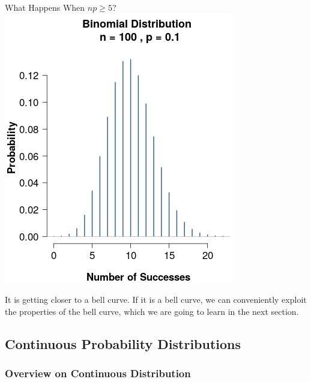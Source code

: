 \documentclass{beamer}
\begin{document}
\begin{frame}{What Happens When $np \geq 5$? }
\includegraphics[scale=0.34]{images/section4BinomNP3.png}

\vspace{0.3 cm}
It is getting closer to a bell curve. If it is a bell curve, we can conveniently exploit the properties of the bell curve, which we are going to learn in the next section. 

\end{frame}


\subsection{Continuous Probability Distributions}
\begin{frame}
\subsectionpage
\end{frame}

\subsubsection{Overview on Continuous Distribution}
\end{document}
